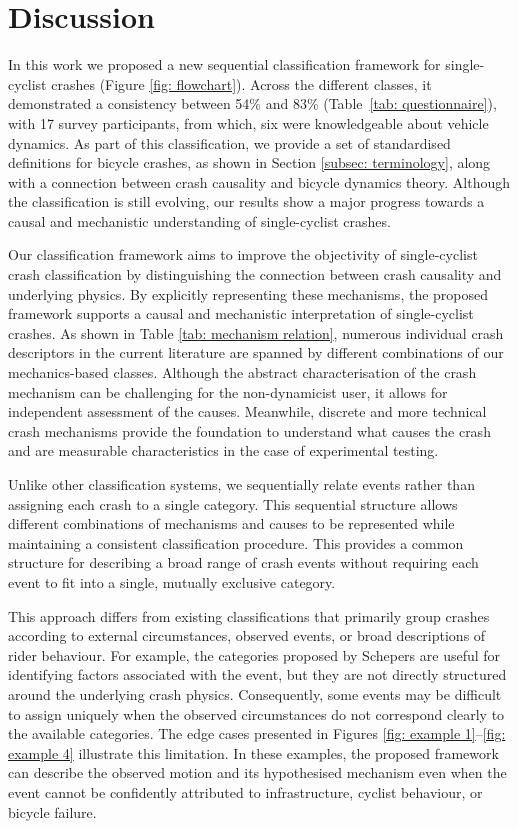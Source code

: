\documentclass{article}
\begin{document}
\section{Discussion} \label{sec: discussion}
%
In this work we proposed a new sequential classification framework for single-cyclist crashes (Figure \ref{fig: flowchart}).
%
Across the different classes, it demonstrated a consistency between 54\% and 83\% (Table~\ref{tab: questionnaire}), with 17 survey participants, from which, six were knowledgeable about vehicle dynamics.
%
As part of this classification, we provide a set of standardised definitions for bicycle crashes, as shown in Section \ref{subsec: terminology}, along with a connection between crash causality and bicycle dynamics theory.
%
Although the classification is still evolving, our results show a major progress towards a causal and mechanistic understanding of single-cyclist crashes.


Our classification framework aims to improve the objectivity of single-cyclist crash classification by distinguishing the connection between crash causality and underlying physics.
%
By explicitly representing these mechanisms, the proposed framework supports a causal and mechanistic interpretation of single-cyclist crashes.
%
As shown in Table \ref{tab: mechanism relation}, numerous individual crash descriptors in the current literature are spanned by different combinations of our mechanics-based classes.
%
Although the abstract characterisation of the crash mechanism can be challenging for the non-dynamicist user, it allows for independent assessment of the causes.
%
Meanwhile, discrete and more technical crash mechanisms provide the foundation to understand what causes the crash and are measurable characteristics in the case of experimental testing.


Unlike other classification systems, we sequentially relate events rather than assigning each crash to a single category.
%
This sequential structure allows different combinations of mechanisms and causes to be represented while maintaining a consistent classification procedure. 
%
This provides a common structure for describing a broad range of crash events without requiring each event to fit into a single, mutually exclusive category.


This approach differs from existing classifications that primarily group crashes according to external circumstances, observed events, or broad descriptions of rider behaviour.
%
For example, the categories proposed by Schepers \cite{Sch12} are useful for identifying factors associated with the event, but they are not directly structured around the underlying crash physics.
%
Consequently, some events may be difficult to assign uniquely when the observed circumstances do not correspond clearly to the available categories.
%
The edge cases presented in Figures \ref{fig: example 1}--\ref{fig: example 4} illustrate this limitation.
%
In these examples, the proposed framework can describe the observed motion and its hypothesised mechanism even when the event cannot be confidently attributed to infrastructure, cyclist behaviour, or bicycle failure.
\end{document}
